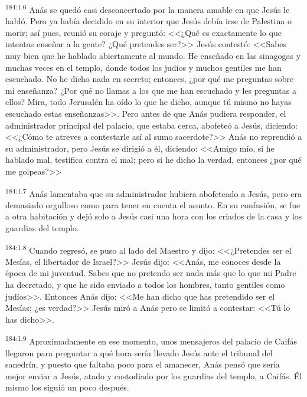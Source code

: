 \par 
\textsuperscript{184:1.6} Anás se quedó casi desconcertado por la manera amable en que Jesús le habló. Pero ya había decidido en su interior que Jesús debía irse de Palestina o morir; así pues, reunió su coraje y preguntó: <<¿Qué es exactamente lo que intentas enseñar a la gente? ¿Qué pretendes ser?>> Jesús contestó: <<Sabes muy bien que he hablado abiertamente al mundo. He enseñado en las sinagogas y muchas veces en el templo, donde todos los judíos y muchos gentiles me han escuchado. No he dicho nada en secreto; entonces, ¿por qué me preguntas sobre mi enseñanza? ¿Por qué no llamas a los que me han escuchado y les preguntas a ellos? Mira, todo Jerusalén ha oído lo que he dicho, aunque tú mismo no hayas escuchado estas enseñanzas>>. Pero antes de que Anás pudiera responder, el administrador principal del palacio, que estaba cerca, abofeteó a Jesús, diciendo: <<¿Cómo te atreves a contestarle así al sumo sacerdote?>> Anás no reprendió a su administrador, pero Jesús se dirigió a él, diciendo: <<Amigo mío, si he hablado mal, testifica contra el mal; pero si he dicho la verdad, entonces ¿por qué me golpeas?>>

\par 
\textsuperscript{184:1.7} Anás lamentaba que su administrador hubiera abofeteado a Jesús, pero era demasiado orgulloso como para tener en cuenta el asunto. En su confusión, se fue a otra habitación y dejó solo a Jesús casi una hora con los criados de la casa y los guardias del templo.

\par 
\textsuperscript{184:1.8} Cuando regresó, se puso al lado del Maestro y dijo: <<¿Pretendes ser el Mesías, el libertador de Israel?>> Jesús dijo: <<Anás, me conoces desde la época de mi juventud. Sabes que no pretendo ser nada más que lo que mi Padre ha decretado, y que he sido enviado a todos los hombres, tanto gentiles como judíos>>. Entonces Anás dijo: <<Me han dicho que has pretendido ser el Mesías; ¿es verdad?>> Jesús miró a Anás pero se limitó a contestar: <<Tú lo has dicho>>.

\par 
\textsuperscript{184:1.9} Aproximadamente en ese momento, unos mensajeros del palacio de Caifás llegaron para preguntar a qué hora sería llevado Jesús ante el tribunal del sanedrín, y puesto que faltaba poco para el amanecer, Anás pensó que sería mejor enviar a Jesús, atado y custodiado por los guardias del templo, a Caifás. Él mismo los siguió un poco después.

